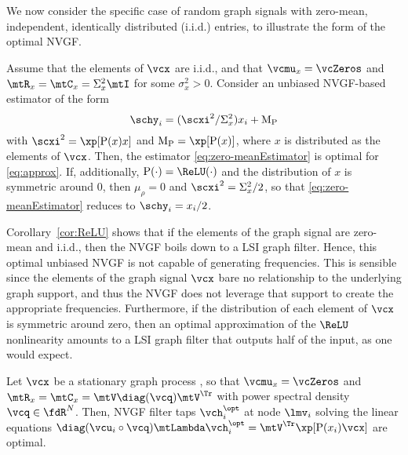 \else
We now consider the specific case of random graph signals with zero-mean, independent, identically distributed (i.i.d.) entries, to illustrate the form of the optimal NVGF.

\begin{corollary} \label{cor:ReLU}
Assume that the elements of $\vcx$ are i.i.d., and that $\vcmu_{x} = \vcZeros$ and $\mtR_{x} = \mtC_{x} = \sigma_{x}^{2} \mtI$ for some $\sigma_{x}^{2} > 0$. Consider an unbiased NVGF-based estimator of the form
\begin{equation} \label{eq:zero-meanEstimator}
    \schy_{i} = (\scxi^{2}/\sigma_{x}^{2}) x_{i} + \mu_{\rho}
\end{equation}
with $\scxi^{2} = \xp[\rho(x)x]$ and $\mu_{\rho} = \xp[\rho(x)]$, where $x$ is distributed as the elements of $\vcx$. Then, the estimator \eqref{eq:zero-meanEstimator} is optimal for \eqref{eq:approx}. If, additionally, $\rho(\cdot)=\ReLU(\cdot)$ and the distribution of $x$ is symmetric around $0$, then $\mu_{\rho}=0$ and $\scxi^{2} = \sigma_{x}^{2}/2$, so that \eqref{eq:zero-meanEstimator} reduces to $\schy_{i} = x_{i}/2$.
\end{corollary}

Corollary~\ref{cor:ReLU} shows that if the elements of the graph signal are zero-mean and i.i.d., then the NVGF boils down to a LSI graph filter. Hence, this optimal unbiased NVGF is not capable of generating frequencies. This is sensible since the elements of the graph signal $\vcx$ bare no relationship to the underlying graph support, and thus the NVGF does not leverage that support to create the appropriate frequencies. Furthermore, if the distribution of each element of $\vcx$ is symmetric around zero, then an optimal approximation of the $\ReLU$ nonlinearity amounts to a LSI graph filter that outputs half of the input, as one would expect.

\begin{corollary} \label{cor:stationary}
Let $\vcx$ be a stationary graph process \cite{Perraudin2017-StationaryGSP, Marques2017-StationaryGSP}, so that $\vcmu_{x} = \vcZeros$ and $\mtR_{x} = \mtC_{x} = \mtV \diag(\vcq) \mtV^{\Tr}$ with power spectral density $\vcq \in \fdR^{N}$. Then, NVGF filter taps $\vch_i^{\opt}$ at node $\lmv_{i}$ solving the linear equations $\diag(\vcu_{i} \circ \vcq) \mtLambda \vch_{i}^{\opt} = \mtV^{\Tr} \xp [\rho(x_{i}) \vcx]$ are optimal.
\end{corollary}

